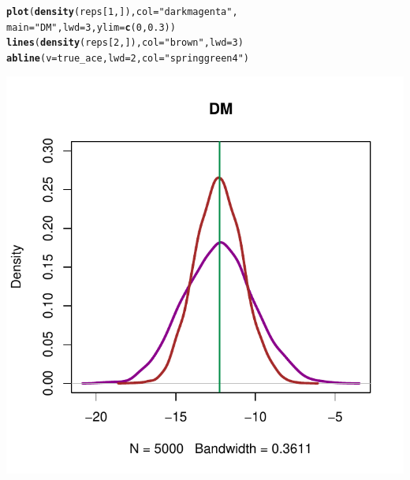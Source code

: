 \documentclass[12 pt]{article}\usepackage[]{graphicx}\usepackage[]{color}
\makeatletter
\def\maxwidth{ %
  \ifdim\Gin@nat@width>\linewidth
    \linewidth
  \else
    \Gin@nat@width
  \fi
}
\newcommand{\hlnum}[1]{\textcolor[rgb]{0.686,0.059,0.569}{#1}}%
\newcommand{\hlstr}[1]{\textcolor[rgb]{0.192,0.494,0.8}{#1}}%
\newcommand{\hlstd}[1]{\textcolor[rgb]{0.345,0.345,0.345}{#1}}%
\newcommand{\hlkwc}[1]{\textcolor[rgb]{0.333,0.667,0.333}{#1}}%
\newcommand{\hlkwd}[1]{\textcolor[rgb]{0.737,0.353,0.396}{\textbf{#1}}}%
\newenvironment{kframe}{%
 \def\at@end@of@kframe{}%
 \ifinner\ifhmode%
  \def\at@end@of@kframe{\end{minipage}}%
  \begin{minipage}{\columnwidth}%
 \fi\fi%
 \def\FrameCommand##1{\hskip\@totalleftmargin \hskip-\fboxsep
 \colorbox{shadecolor}{##1}\hskip-\fboxsep
     \hskip-\linewidth \hskip-\@totalleftmargin \hskip\columnwidth}%
 \MakeFramed {\advance\hsize-\width
   \@totalleftmargin\z@ \linewidth\hsize
   \@setminipage}}%
 {\par\unskip\endMakeFramed%
 \at@end@of@kframe}
\newenvironment{knitrout}{}{} %
\makeatother
\begin{document}
\begin{knitrout}
\color{fgcolor}\begin{kframe}
\begin{alltt}
\hlkwd{plot}\hlstd{(}\hlkwd{density}\hlstd{(reps[}\hlnum{1}\hlstd{, ]),} \hlkwc{col} \hlstd{=} \hlstr{"darkmagenta"}\hlstd{,}
    \hlkwc{main} \hlstd{=} \hlstr{"DM"}\hlstd{,} \hlkwc{lwd} \hlstd{=} \hlnum{3}\hlstd{,} \hlkwc{ylim} \hlstd{=} \hlkwd{c}\hlstd{(}\hlnum{0}\hlstd{,} \hlnum{0.3}\hlstd{))}
\hlkwd{lines}\hlstd{(}\hlkwd{density}\hlstd{(reps[}\hlnum{2}\hlstd{, ]),} \hlkwc{col} \hlstd{=} \hlstr{"brown"}\hlstd{,} \hlkwc{lwd} \hlstd{=} \hlnum{3}\hlstd{)}
\hlkwd{abline}\hlstd{(}\hlkwc{v} \hlstd{= true_ace,} \hlkwc{lwd} \hlstd{=} \hlnum{2}\hlstd{,} \hlkwc{col} \hlstd{=} \hlstr{"springgreen4"}\hlstd{)}
\end{alltt}
\end{kframe}

{\centering \includegraphics[width=\maxwidth]{figure/minimal-unnamed-chunk-5-1} 

}



\end{knitrout}
\end{document}
